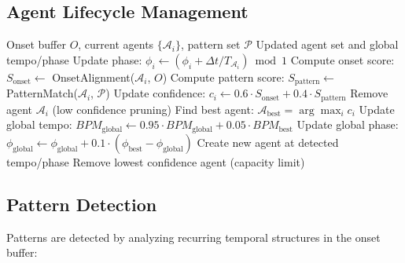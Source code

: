 \documentclass[11pt,a4paper]{article}
\begin{document}
\subsection{Agent Lifecycle Management}

\begin{algorithm}
\caption{Multi-Agent Beat Tracking Update}
\begin{algorithmic}[1]
\REQUIRE Onset buffer $O$, current agents $\{\mathcal{A}_i\}$, pattern set $\mathcal{P}$
\ENSURE Updated agent set and global tempo/phase
    \STATE Update phase: $\phi_i \leftarrow (\phi_i + \Delta t / T_{\mathcal{A}_i}) \bmod 1$
    \STATE Compute onset score: $S_{\text{onset}} \leftarrow$ OnsetAlignment($\mathcal{A}_i$, $O$)
    \STATE Compute pattern score: $S_{\text{pattern}} \leftarrow$ PatternMatch($\mathcal{A}_i$, $\mathcal{P}$)
    \STATE Update confidence: $c_i \leftarrow 0.6 \cdot S_{\text{onset}} + 0.4 \cdot S_{\text{pattern}}$
        \STATE Remove agent $\mathcal{A}_i$ (low confidence pruning)
    \ENDIF
\ENDFOR
\STATE Find best agent: $\mathcal{A}_{\text{best}} = \arg\max_i c_i$
\STATE Update global tempo: $BPM_{\text{global}} \leftarrow 0.95 \cdot BPM_{\text{global}} + 0.05 \cdot BPM_{\text{best}}$
\STATE Update global phase: $\phi_{\text{global}} \leftarrow \phi_{\text{global}} + 0.1 \cdot (\phi_{\text{best}} - \phi_{\text{global}})$
    \STATE Create new agent at detected tempo/phase
        \STATE Remove lowest confidence agent (capacity limit)
    \ENDIF
\ENDIF
\end{algorithmic}
\end{algorithm}

\subsection{Pattern Detection}

Patterns are detected by analyzing recurring temporal structures in the onset buffer:
\end{document}

